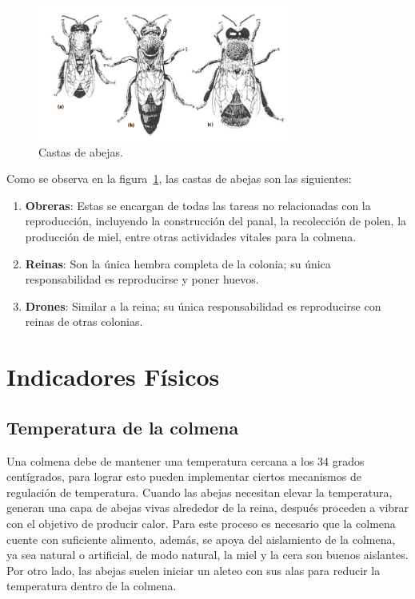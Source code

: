 \begin{figure}[htbp]
  \centering
  \includegraphics[width=0.75\textwidth]{assets/abejas.png}
  \caption{Castas de abejas. \cite{david_cramp}}
  \label{fig:abejas}
\end{figure}

Como se observa en la figura~\ref{fig:abejas}, las castas de abejas son las siguientes:
\begin{enumerate}
  \renewcommand\labelenumi{\alph{enumi})}
  \item \textbf{Obreras}: Estas se encargan de todas las tareas no relacionadas con la reproducción, incluyendo la construcción del panal, la recolección de polen, la producción de miel, entre otras actividades vitales para la colmena.
  \item \textbf{Reinas}: Son la única hembra completa de la colonia; su única responsabilidad es reproducirse y poner huevos.
  \item \textbf{Drones}: Similar a la reina; su única responsabilidad es reproducirse con reinas de otras colonias.
\end{enumerate}
\section{Indicadores Físicos}

\subsection{Temperatura de la colmena}
Una colmena debe de mantener una temperatura cercana a los 34 grados centígrados, para lograr esto pueden implementar ciertos mecanismos de regulación de temperatura. \cite{david_cramp}
Cuando las abejas necesitan elevar la temperatura, generan una capa de abejas vivas alrededor de la reina, después proceden a vibrar con el objetivo de producir calor. Para este proceso es necesario que la colmena cuente con suficiente alimento, además, se apoya del aislamiento de la colmena, ya sea natural o artificial, de modo natural, la miel y la cera son buenos aislantes. \cite{chadwick_alton_tennant_fitzmaurice_earl_2016}
Por otro lado, las abejas suelen iniciar un aleteo con sus alas para reducir la temperatura dentro de la colmena. \cite{chadwick_alton_tennant_fitzmaurice_earl_2016}


